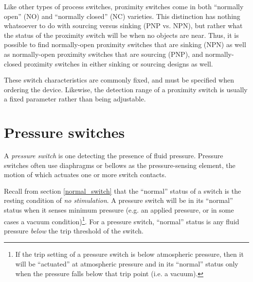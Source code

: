 \vskip 10pt

Like other types of process switches, proximity switches come in both ``normally open'' (NO) and ``normally closed'' (NC) varieties.  This distinction has nothing whatsoever to do with sourcing versus sinking (PNP vs. NPN), but rather what the status of the proximity switch will be when no objects are near.  Thus, it is possible to find normally-open proximity switches that are sinking (NPN) as well as normally-open proximity switches that are sourcing (PNP), and normally-closed proximity switches in either sinking or sourcing designs as well.

These switch characteristics are commonly fixed, and must be specified when ordering the device.  Likewise, the detection range of a proximity switch is usually a fixed parameter rather than being adjustable.









\filbreak
\section{Pressure switches}

A \textit{pressure switch} is one detecting the presence of fluid pressure.  Pressure switches often use diaphragms or bellows as the pressure-sensing element, the motion of which actuates one or more switch contacts. 

Recall from section \ref{normal_switch} that the ``normal'' status of a switch is the resting condition of \textit{no stimulation}.  A pressure switch will be in its ``normal'' status when it senses minimum pressure (e.g. an applied pressure, or in some cases a vacuum condition)\footnote{If the trip setting of a pressure switch is below atmospheric pressure, then it will be ``actuated'' at atmospheric pressure and in its ``normal'' status only when the pressure falls below that trip point (i.e. a vacuum).}.  For a pressure switch, ``normal'' status is any fluid pressure \textit{below} the trip threshold of the switch.  

